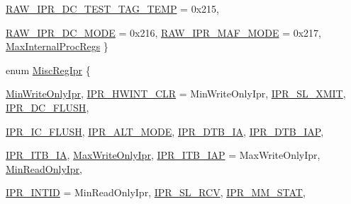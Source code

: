 \begin{DoxyCompactItemize}
\hyperlink{namespaceAlphaISA_a0cd208652efde0d49b6a875aea151470aea9221ede5710f12211aa553c79ea81d}{RAW\_\-IPR\_\-DC\_\-TEST\_\-TAG\_\-TEMP} =  0x215, 
\par
\hyperlink{namespaceAlphaISA_a0cd208652efde0d49b6a875aea151470ab58ef95f917d3ea3fbf4fe8df2081222}{RAW\_\-IPR\_\-DC\_\-MODE} =  0x216, 
\hyperlink{namespaceAlphaISA_a0cd208652efde0d49b6a875aea151470aabaa18cd0ab31ab9c92fd180490d5a3a}{RAW\_\-IPR\_\-MAF\_\-MODE} =  0x217, 
\hyperlink{namespaceAlphaISA_a0cd208652efde0d49b6a875aea151470ac2ddaedba45a41592950f664c7aa4b14}{MaxInternalProcRegs}
 \}
\item 
enum \hyperlink{namespaceAlphaISA_ac76a902b2e65598399068bb755d21c61}{MiscRegIpr} \{ \par
\hyperlink{namespaceAlphaISA_ac76a902b2e65598399068bb755d21c61a59bd251b1ad810cd67093187c051a010}{MinWriteOnlyIpr}, 
\hyperlink{namespaceAlphaISA_ac76a902b2e65598399068bb755d21c61ac0d1856856f97da8328c84f8bda9179f}{IPR\_\-HWINT\_\-CLR} =  MinWriteOnlyIpr, 
\hyperlink{namespaceAlphaISA_ac76a902b2e65598399068bb755d21c61ab0236cbaf4ae5779b0043d884f7c271d}{IPR\_\-SL\_\-XMIT}, 
\hyperlink{namespaceAlphaISA_ac76a902b2e65598399068bb755d21c61ada348112af0574bce75d23cb2019dc49}{IPR\_\-DC\_\-FLUSH}, 
\par
\hyperlink{namespaceAlphaISA_ac76a902b2e65598399068bb755d21c61a7bf4266a5083510eb6682c224ce5d00b}{IPR\_\-IC\_\-FLUSH}, 
\hyperlink{namespaceAlphaISA_ac76a902b2e65598399068bb755d21c61ae2d15925c3814bb0e3035b3bff863a07}{IPR\_\-ALT\_\-MODE}, 
\hyperlink{namespaceAlphaISA_ac76a902b2e65598399068bb755d21c61aa07b9e24a054529eb5a8828d538f8e48}{IPR\_\-DTB\_\-IA}, 
\hyperlink{namespaceAlphaISA_ac76a902b2e65598399068bb755d21c61a70e3295d7ffe431fe84399e0deabfc5a}{IPR\_\-DTB\_\-IAP}, 
\par
\hyperlink{namespaceAlphaISA_ac76a902b2e65598399068bb755d21c61a5121e2a2616408b3b58f5e91e3a3338f}{IPR\_\-ITB\_\-IA}, 
\hyperlink{namespaceAlphaISA_ac76a902b2e65598399068bb755d21c61a269cef44d2ee3302c3a77aba0da13ea2}{MaxWriteOnlyIpr}, 
\hyperlink{namespaceAlphaISA_ac76a902b2e65598399068bb755d21c61a8810ea6c34adae6bef733f59ec4b53ec}{IPR\_\-ITB\_\-IAP} =  MaxWriteOnlyIpr, 
\hyperlink{namespaceAlphaISA_ac76a902b2e65598399068bb755d21c61a9a675e80813452603be7e80490256653}{MinReadOnlyIpr}, 
\par
\hyperlink{namespaceAlphaISA_ac76a902b2e65598399068bb755d21c61a03a41fe93f0820fe546ce9a335bfaaee}{IPR\_\-INTID} =  MinReadOnlyIpr, 
\hyperlink{namespaceAlphaISA_ac76a902b2e65598399068bb755d21c61a2fad37d4e16b091324251e1483064607}{IPR\_\-SL\_\-RCV}, 
\hyperlink{namespaceAlphaISA_ac76a902b2e65598399068bb755d21c61a637423e4f7001758ea6ffad54fef64f2}{IPR\_\-MM\_\-STAT}, 

\end{DoxyCompactItemize}
